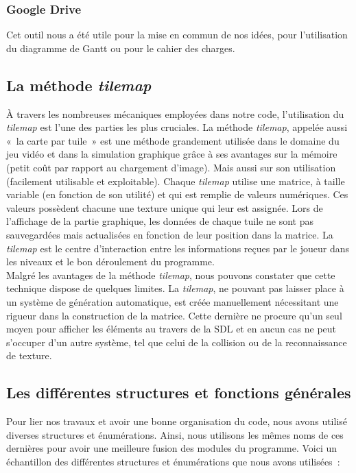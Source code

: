\documentclass[12pt,a4paper]{article}
\begin{document}
            \subsubsection{Google Drive}
                \tabto{1cm} Cet outil nous a été utile pour la mise en commun de nos idées, pour l’utilisation du diagramme de Gantt ou pour le cahier des charges.

        \subsection{La méthode \textit{tilemap}}
            \tabto{1cm} À travers les nombreuses mécaniques employées dans notre code, l’utilisation du \textit{tilemap} est l’une des parties les plus cruciales. La méthode \textit{tilemap}, appelée aussi «~la carte par tuile~» est une méthode grandement utilisée dans le domaine du jeu vidéo et dans la simulation graphique grâce à ses avantages sur la mémoire (petit coût par rapport au chargement d’image). Mais aussi sur son utilisation (facilement utilisable et exploitable). Chaque \textit{tilemap} utilise une matrice, à taille variable (en fonction de son utilité) et qui est remplie de valeurs numériques. Ces valeurs possèdent chacune une texture unique qui leur est assignée. Lors de l’affichage de la partie graphique, les données de chaque tuile ne sont pas sauvegardées mais actualisées en fonction de leur position dans la matrice. La \textit{tilemap} est le centre d’interaction entre les informations reçues par le joueur dans les niveaux et le bon déroulement du programme.\\
	
        	\tabto{1cm} Malgré les avantages de la méthode \textit{tilemap}, nous pouvons constater que cette technique dispose de quelques limites. La \textit{tilemap}, ne pouvant pas laisser place à un système de génération automatique, est créée manuellement nécessitant une rigueur dans la construction de la matrice. Cette dernière ne procure qu’un seul moyen pour afficher les éléments au travers de la SDL et en aucun cas ne peut s’occuper d’un autre système, tel que celui de la collision ou de la reconnaissance de texture.

         \subsection{Les différentes structures et fonctions générales}
            \tabto{1cm} Pour lier nos travaux et avoir une bonne organisation du code, nous avons utilisé diverses structures et énumérations. Ainsi, nous utilisons les mêmes noms de ces dernières pour avoir une meilleure fusion des modules du programme. Voici un échantillon des différentes structures et énumérations que nous avons utilisées~:\\
\end{document}
